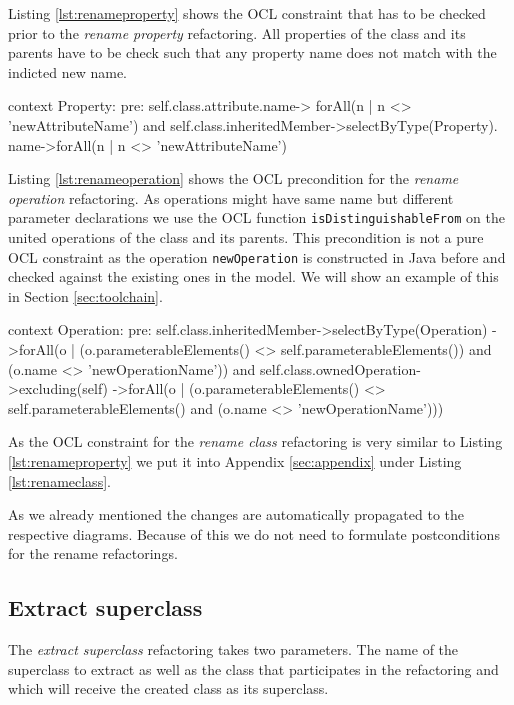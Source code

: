 \documentclass{llncs}
\begin{document}
Listing \ref{lst:renameproperty} shows the OCL constraint that has to be checked prior to the \textit{rename property} 
refactoring. All properties of the class and its parents have to be check such that any property name does not match 
with the indicted new name.

\begin{lstsingle}[language=OCL,caption=OCL for \textit{rename property} refactoring,label=lst:renameproperty]
context Property:
pre:  self.class.attribute.name->
        forAll(n | n <> 'newAttributeName') 
      and 
      self.class.inheritedMember->selectByType(Property).
        name->forAll(n | n <> 'newAttributeName')
\end{lstsingle}

Listing \ref{lst:renameoperation} shows the OCL precondition for the \textit{rename operation} refactoring. As operations 
might have same name but different parameter declarations we use the OCL function \texttt{isDistinguishableFrom} on the 
united operations of the class and its parents. This precondition is not a pure OCL constraint as the operation \texttt{newOperation} 
is constructed in Java before and checked against the existing ones in the model. We will show an example of this in 
Section \ref{sec:toolchain}.

\begin{lstsingle}[language=OCL,caption=OCL for \textit{rename operation} refactoring,label=lst:renameoperation]
context Operation:
pre:  self.class.inheritedMember->selectByType(Operation)
        ->forAll(o | (o.parameterableElements() <> 
          self.parameterableElements()) 
          and (o.name <> 'newOperationName')) 
      and 
      self.class.ownedOperation->excluding(self)
        ->forAll(o | (o.parameterableElements() <> 
          self.parameterableElements() 
          and (o.name <> 'newOperationName')))
\end{lstsingle}

As the OCL constraint for the \textit{rename class} refactoring is very similar to Listing \ref{lst:renameproperty} 
we put it into Appendix \ref{sec:appendix} under Listing \ref{lst:renameclass}.

As we already mentioned the changes are automatically propagated to the respective diagrams. Because of this we do 
not need to formulate postconditions for the rename refactorings.

\subsection{Extract superclass}
\label{sec:extract}
The \textit{extract superclass} refactoring takes two parameters. The name of the superclass to extract as well as
the class that participates in the refactoring and which will receive the created class as its superclass.
\end{document}
